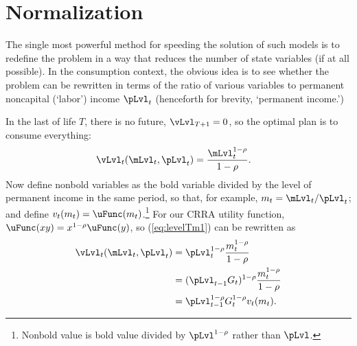 \hypertarget{normalization}{}
\section{Normalization}\label{sec:normalization}

The single most powerful method for speeding the solution of such models is to redefine the problem in a way that reduces the number of state variables (if at all possible).  In the consumption context, the obvious idea is to see whether the problem can be rewritten in terms of the ratio of various variables to permanent noncapital (`labor') income $\pLvl_{t}$ (henceforth for brevity, `permanent income.')

In the last {\interval} of life $T$, there is no future, $\vLvl_{T+1} = 0$, so the optimal plan is to consume everything:
\begin{equation}\begin{gathered}\begin{aligned}
      \vLvl_{t}(\mLvl_{t},\pLvl_{t})  & = \frac{\mLvl_{t}^{1-\rho}}{1-\rho}. \label{eq:levelTm1}
    \end{aligned}\end{gathered}\end{equation}
Now define nonbold variables as the bold variable divided by the level of permanent income in the same period, so that, for example, ${m}_{t}=\mLvl_{t}/\pLvl_{t}$; and define $v_{t}({m}_{t}) = \uFunc({m}_{t})$.\footnote{Nonbold value is bold value divided by $\pLvl^{1-\rho}$ rather than $\pLvl$.}  For our CRRA utility function, $\uFunc(xy)=x^{1-\rho}\uFunc(y)$, so (\ref{eq:levelTm1}) can be rewritten as
\begin{equation}\begin{gathered}\begin{aligned}
      \vLvl_{t}(\mLvl_{t},\pLvl_{t}) & = \pLvl_{t}^{1-\rho}\frac{{m}_{t}^{1-\rho}}{1-\rho}                       \\
                                                & = (\pLvl_{t-1}G_{t})^{1-\rho}\frac{{m}_{t}^{1-\rho}}{1-\rho} \\
                                                &= \pLvl_{t-1}^{1-\rho}G_{t}^{1-\rho}v_{t}({m}_{t}). \label{eq:vT}
    \end{aligned}\end{gathered}\end{equation}


